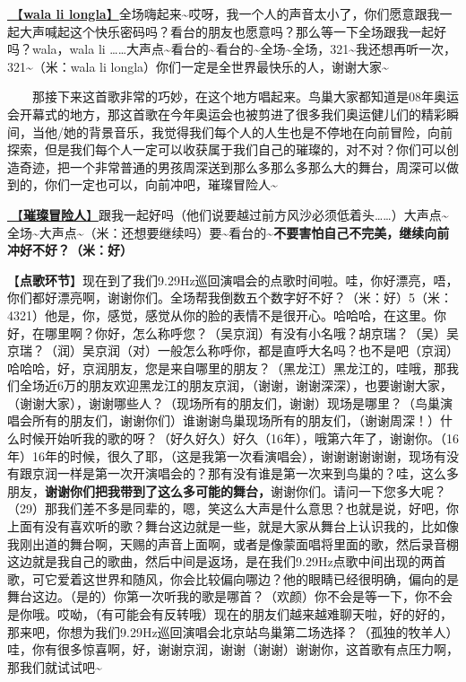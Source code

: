 \documentclass[]{ctexbook}
\begin{document}
\hyperref[wala-li-longla]{🎵【\textbf{wala li longla}】}全场嗨起来\textasciitilde 哎呀，我一个人的声音太小了，你们愿意跟我一起大声喊起这个快乐密码吗？看台的朋友也愿意吗？那么等一下全场跟我一起好吗？wala，wala li \ldots\ldots 大声点\textasciitilde 看台的\textasciitilde 看台的\textasciitilde 全场\textasciitilde 全场，321\textasciitilde 我还想再听一次，321\textasciitilde（米：wala li longla）你们一定是全世界最快乐的人，谢谢大家\textasciitilde{}

  那接下来这首歌非常的巧妙，在这个地方唱起来。鸟巢大家都知道是08年奥运会开幕式的地方，那这首歌在今年奥运会也被剪进了很多我们奥运健儿们的精彩瞬间，当他/她的背景音乐，我觉得我们每个人的人生也是不停地在向前冒险，向前探索，但是我们每个人一定可以收获属于我们自己的璀璨的，对不对？你们可以创造奇迹，把一个非常普通的男孩周深送到那么多那么多那么大的舞台，周深可以做到的，你们一定也可以，向前冲吧，璀璨冒险人\textasciitilde{}

\hyperref[adventurers]{🎵【\textbf{璀璨冒险人}】}跟我一起好吗（他们说要越过前方风沙必须低着头\ldots\ldots）大声点\textasciitilde 全场\textasciitilde 大声点\textasciitilde（米：还想要继续吗）要\textasciitilde 看台的\textasciitilde{}\textbf{不要害怕自己不完美，继续向前冲好不好？（米：好）}

【\textbf{点歌环节}】现在到了我们9.29Hz巡回演唱会的点歌时间啦。哇，你好漂亮，唔，你们都好漂亮啊，谢谢你们。全场帮我倒数五个数字好不好？（米：好）5（米：4321）他是，你，感觉，感觉从你的脸的表情不是很开心。哈哈哈，在这里。你好，在哪里啊？你好，怎么称呼您？（吴京润）有没有小名哦？胡京瑞？（吴）吴京瑞？（润）吴京润（对）一般怎么称呼你，都是直呼大名吗？也不是吧（京润）哈哈哈，好，京润朋友，您是来自哪里的朋友？（黑龙江）黑龙江的，哇哦，那我们全场近6万的朋友欢迎黑龙江的朋友京润，（谢谢，谢谢深深），也要谢谢大家，（谢谢大家），谢谢哪些人？（现场所有的朋友们，谢谢）现场是哪里？（鸟巢演唱会所有的朋友们，谢谢你们）谁谢谢鸟巢现场所有的朋友们，（谢谢周深！）什么时候开始听我的歌的呀？（好久好久）好久（16年），哦第六年了，谢谢你。（16年）16年的时候，很久了耶，（这是我第一次看演唱会），谢谢谢谢谢谢，现场有没有跟京润一样是第一次开演唱会的？那有没有谁是第一次来到鸟巢的？哇，这么多朋友，\textbf{谢谢你们把我带到了这么多可能的舞台，}谢谢你们。请问一下您多大呢？（29）那我们差不多是同辈的，嗯，笑这么大声是什么意思？也就是说，好吧，你上面有没有喜欢听的歌？舞台这边就是一些，就是大家从舞台上认识我的，比如像我刚出道的舞台啊，天赐的声音上面啊，或者是像蒙面唱将里面的歌，然后录音棚这边就是我自己的歌曲，然后中间是返场，是在我们9.29Hz点歌中间出现的两首歌，可它爱着这世界和随风，你会比较偏向哪边？他的眼睛已经很明确，偏向的是舞台这边。（是的）你第一次听我的歌是哪首？（欢颜）你不会是等一下，你不会是你哦。哎呦，（有可能会有反转哦）现在的朋友们越来越难聊天啦，好的好的，那来吧，你想为我们9.29Hz巡回演唱会北京站鸟巢第二场选择？（孤独的牧羊人）哇，你有很多惊喜啊，好，谢谢京润，谢谢（谢谢）谢谢你，这首歌有点压力啊，那我们就试试吧\textasciitilde{}
\end{document}
